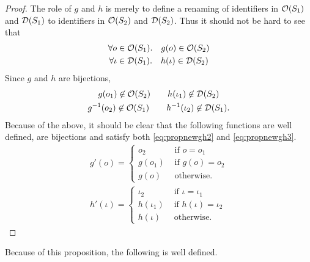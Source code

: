 \begin{proof}
  The role of $g$ and $h$ is merely to define a renaming of identifiers in
  $\mathcal{O}(S_1)$ and $\mathcal{D}(S_1)$ to identifiers in $\mathcal{O}(S_2)$ and $\mathcal{D}(S_2)$.
  Thus it should not be hard to see that
  \begin{equation*}
    \begin{gathered}
      \forall o \in \mathcal{O}(S_1). \quad g(o) \in \mathcal{O}(S_2) \\
      \forall \iota \in \mathcal{D}(S_1). \quad h(\iota) \in \mathcal{D}(S_2)
    \end{gathered}
  \end{equation*}
  Since $g$ and $h$ are bijections,
  \begin{equation*}
    \begin{gathered}
      g(o_1) \not\in \mathcal{O}(S_2) \quad\quad h(\iota_1) \not\in \mathcal{D}(S_2) \\
      g^{-1}(o_2) \not\in \mathcal{O}(S_1) \quad\quad h^{-1}(\iota_2) \not\in \mathcal{D}(S_1).
    \end{gathered}
  \end{equation*}
  Because of the above, it should be clear that the following functions are well
  defined, are bijections and satisfy both \eqref{eq:propnewgh2} and
  \eqref{eq:propnewgh3}.
  \begin{equation*}
    \begin{gathered}
      g'(o) =
      \begin{cases}
        o_2 & \text{ if } o = o_1 \\
        g(o_1) &\text{ if } g(o) = o_2 \\
        g(o) & \text{ otherwise.} 
      \end{cases} \\
      h'(\iota) =
      \begin{cases}
        \iota_2 & \text{ if } \iota = \iota_1 \\
        h(\iota_1) & \text{ if } h(\iota) = \iota_2 \\
        h(\iota) & \text{ otherwise.} 
      \end{cases}
    \end{gathered}
  \end{equation*}
\end{proof}

Because of this proposition, the following is well defined.

